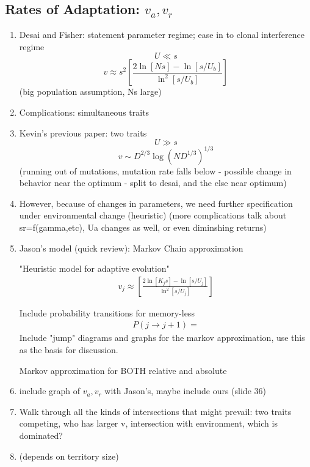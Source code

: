\documentclass[9pt,twocolumn,twoside]{article}
\begin{document}
\subsection{Rates of Adaptation: $v_a , v_r$}
\begin{enumerate}
    \item Desai and Fisher: statement parameter regime; ease in to clonal interference regime
    $$ U \ll s$$
    $$v \approx s^{2}\left[ \frac{2\ln[Ns] - \ln[s/U_{b}]}{\ln^{2}[s/U_{b}]}\right] $$
    (big population assumption, Ns large)
    
    \item Complications: simultaneous traits  
    \item Kevin's previous paper: two traits
    $$ U \gg s$$
    $$ v \sim D^{2/3}\log\left( N D^{1/3}\right)^{1/3}$$
    (running out of mutations, mutation rate falls below - possible change in behavior near the optimum - split to desai, and the else near optimum)
    \item However, because of changes in parameters, we need further specification under environmental change (heuristic) (more complications talk about sr=f(gamma,etc), Ua changes as well, or even diminshing returns)
    \item Jason's model (quick review): Markov Chain approximation
    
    "Heuristic model for adaptive evolution" 
    \begin{align*}
        v_j \approx \left[ \frac{2\ln[K_{j}s] - \ln[s/U_{j}]}{\ln^{2}[s/U_{j}]}\right] 
    \end{align*}
    
    Include probability transitions for memory-less
    \[
    \begin{aligned}
        P(j\rightarrow j+1)=
    \end{aligned}
    \]
    Include "jump" diagrams and graphs for the markov approximation, use this as the basis for discussion.
    
    Markov approximation for BOTH relative and absolute
    
    \item include graph of $v_a, v_r$ with Jason's, maybe include ours (slide 36)
    \item Walk through all the kinds of intersections that might prevail: two traits competing, who has larger v, intersection with environment, which is dominated?
    \item (depends on territory size)
\end{enumerate}
\end{document}
